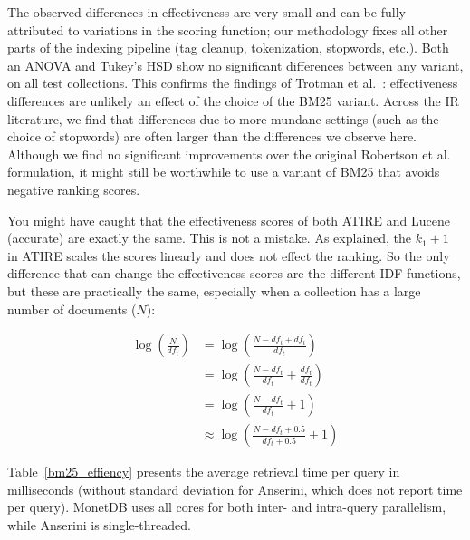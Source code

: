 The observed differences in effectiveness are very small and can be fully attributed to variations in the scoring function; our methodology fixes all other parts of the indexing pipeline (tag cleanup, tokenization, stopwords, etc.). Both an ANOVA and Tukey’s HSD show no significant differences between any variant, on all test collections. This confirms the findings of Trotman et al.~\cite{trotman-bm25}: effectiveness differences are unlikely an effect of the choice of the BM25 variant. Across the IR literature, we find that differences due to more mundane settings (such as the choice of stopwords) are often larger than the differences we observe here. Although we find no significant improvements over the original Robertson et al.~\cite{bm25-robertson} formulation, it might still be worthwhile to use a variant of BM25 that avoids negative ranking scores.

You might have caught that the effectiveness scores of both ATIRE and Lucene (accurate) are exactly the same. This is not a mistake. As explained, the $k_1+1$ in ATIRE scales the scores linearly and does not effect the ranking. So the only difference that can change the effectiveness scores are the different IDF functions, but these are practically the same, especially when a collection has a large number of documents ($N$):

\begin{align}
	\log\left(\frac{N}{df_t}\right) &= \log\left(\frac{N-df_t+df_t}{df_t}\right) \\
									&= \log\left(\frac{N-df_t}{df_t} + \frac{df_t}{df_t}\right) \\
									&= \log\left(\frac{N-df_t}{df_t} + 1\right) \\
									&\approx \log\left(\frac{N-df_t+0.5}{df_t+0.5} + 1\right)
\end{align}

Table~\ref{bm25_effiency} presents the average retrieval time per query in milliseconds (without standard deviation for Anserini, which does not report time per query). MonetDB uses all cores for both inter- and intra-query parallelism, while Anserini is single-threaded.

